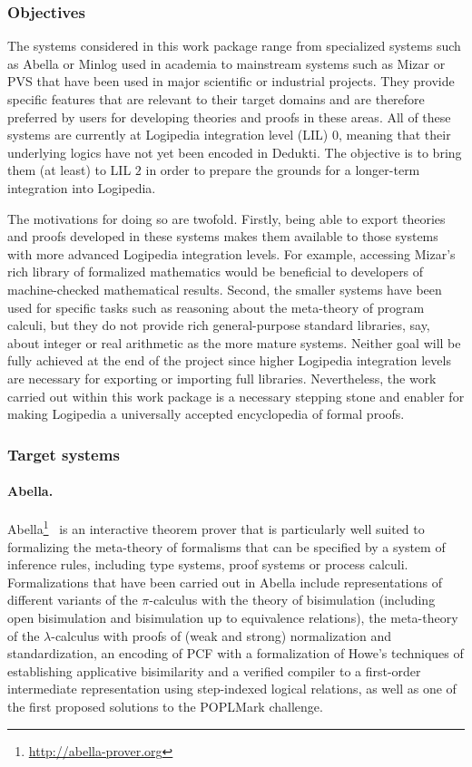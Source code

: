 \subsubsection*{Objectives}

The systems considered in this work package range from specialized systems such
as Abella or Minlog used in academia to mainstream systems such as Mizar or PVS
that have been used in major scientific or industrial projects. They provide
specific features that are relevant to their target domains and are therefore
preferred by users for developing theories and proofs in these areas. All of
these systems are currently at Logipedia integration level (LIL) $0$, meaning
that their underlying logics have not yet been encoded in Dedukti. The objective
is to bring them (at least) to LIL $2$ in order to prepare the grounds for a
longer-term integration into Logipedia.

The motivations for doing so are twofold. Firstly, being able to export theories
and proofs developed in these systems makes them available to those systems with
more advanced Logipedia integration levels. For example, accessing Mizar's rich
library of formalized mathematics would be beneficial to developers of
machine-checked mathematical results. Second, the smaller systems have been used
for specific tasks such as reasoning about the meta-theory of program calculi,
but they do not provide rich general-purpose standard libraries, say, about
integer or real arithmetic as the more mature systems. Neither goal will be
fully achieved at the end of the project since higher Logipedia integration
levels are necessary for exporting or importing full libraries. Nevertheless,
the work carried out within this work package is a necessary stepping stone and
enabler for making Logipedia a universally accepted encyclopedia of formal
proofs.

\subsubsection*{Target systems}

\paragraph*{Abella.}

Abella\footnote{\url{http://abella-prover.org}}~\cite{baelde:abella} is an
interactive theorem prover that is particularly well suited to formalizing the
meta-theory of formalisms that can be specified by a system of inference rules,
including type systems, proof systems or process calculi. Formalizations that
have been carried out in Abella include representations of different variants of
the $\pi$-calculus with the theory of bisimulation (including open bisimulation
and bisimulation up to equivalence relations), the meta-theory of the
$\lambda$-calculus with proofs of (weak and strong) normalization and
standardization, an encoding of PCF with a formalization of Howe's techniques of
establishing applicative bisimilarity and a verified compiler to a first-order
intermediate representation using step-indexed logical relations, as well as one
of the first proposed solutions to the POPLMark challenge.

